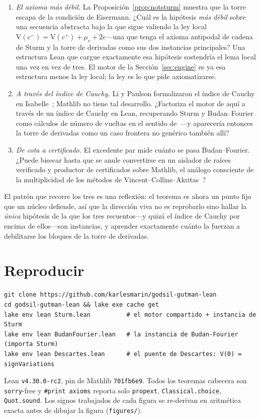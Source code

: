 \documentclass[11pt]{article}
\newcommand{\lean}[1]{{\def\_{\textunderscore\allowbreak}\texttt{#1}}}
\newcommand{\V}{\mathrm{V}}
\begin{document}
\begin{enumerate}\itemsep3pt
\item \emph{El axioma m\'as d\'ebil.} La Proposici\'on~\ref{prop:notsturm} muestra que la torre escapa de
la condici\'on de Eisermann. ¿Cu\'al es la hip\'otesis \emph{m\'as d\'ebil} sobre una secuencia abstracta bajo
la que sigue valiendo la ley local $\V(c^-)=\V(c^+)+\mu_c+2e$---una que tenga el axioma antipodal de cadena de
Sturm y la torre de derivadas como sus dos instancias principales? Una estructura Lean que cargue exactamente
esa hip\'otesis sostendr\'ia el lema local una vez en vez de tres. El motor de la Secci\'on~\ref{sec:engine}
es ya esa estructura menos la ley local; la ley es lo que pide axiomatizarse.
\item \emph{A trav\'es del \'indice de Cauchy.} Li y Paulson formalizaron el \'indice de Cauchy en
Isabelle~\cite{liCauchy}; Mathlib no tiene tal desarrollo. ¿Factoriza el motor de aqu\'i a trav\'es de un
\'indice de Cauchy en Lean, recuperando Sturm y Budan--Fourier como c\'alculos de n\'umero de vueltas en el
sentido de~\cite{eisermann}---y aparecer\'ia entonces la torre de derivadas como un caso frontera no gen\'erico
tambi\'en all\'i?
\item \emph{De cota a certificado.} El excedente par mide cu\'anto se pasa Budan--Fourier. ¿Puede bisecar
hasta que se anule convertirse en un aislador de ra\'ices verificado y productor de certificados sobre Mathlib,
el an\'alogo consciente de la multiplicidad de los m\'etodos de Vincent--Collins--Akritas~\cite{collinsakritas}?
\end{enumerate}

\noindent El patr\'on que recorre los tres es una reflexi\'on: el teorema es ahora un punto fijo que un
n\'ucleo defiende, as\'i que la direcci\'on viva no es reprobarlo sino hallar la \emph{\'unica} hip\'otesis de
la que los tres recuentos---y quiz\'a el \'indice de Cauchy por encima de ellos---son instancias, y aprender
exactamente cu\'anto la fuerzan a debilitarse los bloques de la torre de derivadas.

\section*{Reproducir}
\begin{verbatim}
git clone https://github.com/karlesmarin/godsil-gutman-lean
cd godsil-gutman-lean && lake exe cache get
lake env lean Sturm.lean          # el motor compartido + instancia de Sturm
lake env lean BudanFourier.lean   # la instancia de Budan-Fourier (importa Sturm)
lake env lean Descartes.lean      # el puente de Descartes: V(0) = signVariations
\end{verbatim}
Lean \lean{v4.30.0-rc2}, pin de Mathlib \lean{701fb6e9}. Todos los teoremas cabecera son \lean{sorry}-free y
\lean{\#print axioms} reporta solo \lean{propext}, \lean{Classical.choice}, \lean{Quot.sound}. Los signos
trabajados de cada figura se re-derivan en aritm\'etica exacta antes de dibujar la figura (\lean{figures/}).
\end{document}
